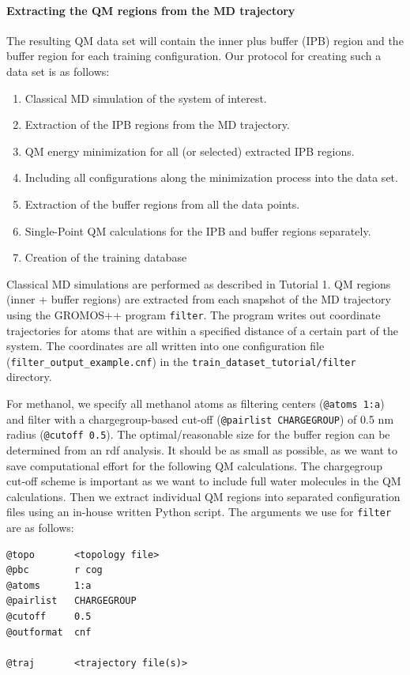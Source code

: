 \paragraph{Extracting the QM regions from the MD trajectory}
The resulting QM data set will contain the inner plus buffer (IPB) region and the buffer region for each training configuration. Our protocol for creating such a data set is as follows: 
\begin{enumerate}
    \item Classical MD simulation of the system of interest.
    \item Extraction of the IPB regions from the MD trajectory.
    \item QM energy minimization for all (or selected) extracted IPB regions.
    \item Including all configurations along the minimization process into the data set.
    \item Extraction of the buffer regions from all the data points.
    \item Single-Point QM calculations for the IPB and buffer regions separately.
    \item Creation of the training database
\end{enumerate}


Classical MD simulations are performed as described in Tutorial 1. QM regions (inner + buffer regions) are extracted from each snapshot of the MD trajectory using the GROMOS++ program \texttt{filter}. The program writes out coordinate trajectories for atoms that are within a specified distance of a certain part of the system. The coordinates are all written into one configuration file (\texttt{filter\_output\_example.cnf}) in the \texttt{train\_dataset\_tutorial/filter} directory.

For methanol, we specify all methanol atoms as filtering centers (\texttt{@atoms 1:a}) and filter with a chargegroup-based cut-off (\texttt{@pairlist CHARGEGROUP}) of 0.5 nm radius (\texttt{@cutoff 0.5}). The optimal/reasonable size for the buffer region can be determined from an rdf analysis. It should be as small as possible, as we want to save computational effort for the following QM calculations. The chargegroup cut-off scheme is important as we want to include full water molecules in the QM calculations. Then we extract individual QM regions into separated configuration files using an in-house written Python script. The arguments we use for \texttt{filter} are as follows:

\begin{lstlisting}[breaklines=true, breakatwhitespace=false]
@topo       <topology file>
@pbc        r cog
@atoms      1:a
@pairlist   CHARGEGROUP
@cutoff     0.5
@outformat  cnf

@traj       <trajectory file(s)>
\end{lstlisting}

